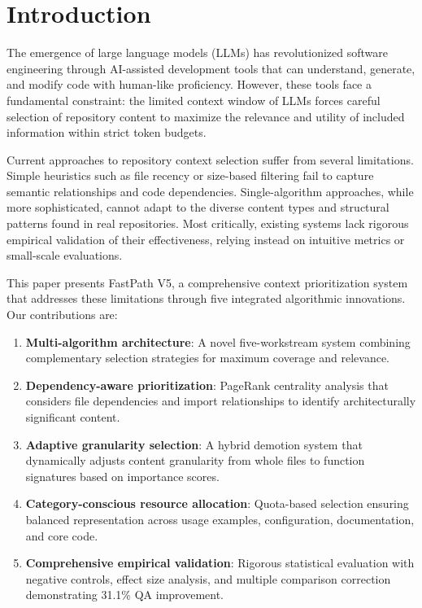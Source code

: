 \documentclass[conference]{IEEEtran}
\begin{document}
\section{Introduction}

The emergence of large language models (LLMs) has revolutionized software engineering through AI-assisted development tools that can understand, generate, and modify code with human-like proficiency. However, these tools face a fundamental constraint: the limited context window of LLMs forces careful selection of repository content to maximize the relevance and utility of included information within strict token budgets.

Current approaches to repository context selection suffer from several limitations. Simple heuristics such as file recency or size-based filtering fail to capture semantic relationships and code dependencies. Single-algorithm approaches, while more sophisticated, cannot adapt to the diverse content types and structural patterns found in real repositories. Most critically, existing systems lack rigorous empirical validation of their effectiveness, relying instead on intuitive metrics or small-scale evaluations.

This paper presents FastPath V5, a comprehensive context prioritization system that addresses these limitations through five integrated algorithmic innovations. Our contributions are:

\begin{enumerate}
\item \textbf{Multi-algorithm architecture}: A novel five-workstream system combining complementary selection strategies for maximum coverage and relevance.

\item \textbf{Dependency-aware prioritization}: PageRank centrality analysis that considers file dependencies and import relationships to identify architecturally significant content.

\item \textbf{Adaptive granularity selection}: A hybrid demotion system that dynamically adjusts content granularity from whole files to function signatures based on importance scores.

\item \textbf{Category-conscious resource allocation}: Quota-based selection ensuring balanced representation across usage examples, configuration, documentation, and core code.

\item \textbf{Comprehensive empirical validation}: Rigorous statistical evaluation with negative controls, effect size analysis, and multiple comparison correction demonstrating 31.1\% QA improvement.
\end{enumerate}
\end{document}

